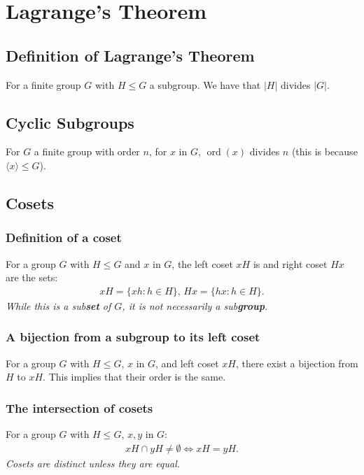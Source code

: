 \documentclass[a4paper, 12pt, twoside]{article}
\DeclareMathOperator{\Ord}{ord}
\begin{document}
\section{Lagrange's Theorem}

\subsection{Definition of Lagrange's Theorem}

For a finite group $G$ with $H \leq G$ a subgroup. We have that
$|H|$ divides $|G|$.

\subsection{Cyclic Subgroups}

For $G$ a finite group with order $n$, for $x$ in $G$, $\Ord(x)$ divides
$n$ (this is because $\langle x \rangle \leq G$).

\subsection{Cosets}

\subsubsection{Definition of a coset}

For a group $G$ with $H \leq G$ and $x$ in $G$, the left coset $xH$ is
and right coset $Hx$ are the sets:
\begin{align*}
      xH = \{xh : h \in H\}, \, Hx = \{hx : h \in H\}.
\end{align*}
\textit{While this is a sub\textbf{set} of $G$, it is not necessarily
      a sub\textbf{group}.}

\subsubsection{A bijection from a subgroup to its left coset}

For a group $G$ with $H \leq G$, $x$ in $G$, and left coset $xH$,
there exist a bijection from $H$ to $xH$. This implies that their
order is the same.

\subsubsection{The intersection of cosets}

For a group $G$ with $H \leq G$, $x, y$ in $G$:
\begin{align*}
      xH \cap yH \neq \emptyset \Leftrightarrow xH = yH.
\end{align*}
\textit{Cosets are distinct unless they are equal.}
\end{document}
